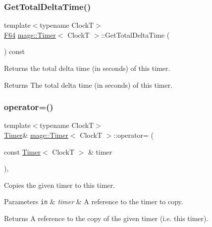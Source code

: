 \subsubsection{\texorpdfstring{Get\+Total\+Delta\+Time()}{GetTotalDeltaTime()}}
{\footnotesize\ttfamily template$<$typename ClockT$>$ \\
\mbox{\hyperlink{namespacemage_ad26233bbec640deda836e572c1a23708}{F64}} \mbox{\hyperlink{classmage_1_1_timer}{mage\+::\+Timer}}$<$ ClockT $>$\+::Get\+Total\+Delta\+Time (\begin{DoxyParamCaption}{ }\end{DoxyParamCaption}) const\hspace{0.3cm}{\ttfamily [noexcept]}}

Returns the total delta time (in seconds) of this timer.

\begin{DoxyReturn}{Returns}
The total delta time (in seconds) of this timer. 
\end{DoxyReturn}
\mbox{\label{classmage_1_1_timer_a2a8aefb272e02d8ba4a26058df80f119}} 
\subsubsection{\texorpdfstring{operator=()}{operator=()}\hspace{0.1cm}{\footnotesize\ttfamily [1/2]}}
{\footnotesize\ttfamily template$<$typename ClockT$>$ \\
\mbox{\hyperlink{classmage_1_1_timer}{Timer}}\& \mbox{\hyperlink{classmage_1_1_timer}{mage\+::\+Timer}}$<$ ClockT $>$\+::operator= (\begin{DoxyParamCaption}\item[{const \mbox{\hyperlink{classmage_1_1_timer}{Timer}}$<$ ClockT $>$ \&}]{timer }\end{DoxyParamCaption})\hspace{0.3cm}{\ttfamily [default]}, {\ttfamily [noexcept]}}

Copies the given timer to this timer.


\begin{DoxyParams}[1]{Parameters}
\mbox{\tt in}  & {\em timer} & A reference to the timer to copy. \\
\hline
\end{DoxyParams}
\begin{DoxyReturn}{Returns}
A reference to the copy of the given timer (i.\+e. this timer). 
\end{DoxyReturn}
\mbox{\label{classmage_1_1_timer_a39654f81efccc38a4cbe6164659407dd}} 
